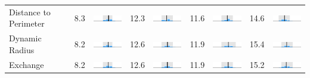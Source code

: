 \begin{table}
\begin{tabular}{l rm{7em} rm{7em} rm{7em} rm{7em}}
Distance to Perimeter  &   8.3 &     \includegraphics[width=7em]{mini_hist/TX_2004_rohrbach} &  12.3 &     \includegraphics[width=7em]{mini_hist/TX_2008_rohrbach} &  11.6 &     \includegraphics[width=7em]{mini_hist/TX_2012_rohrbach} &  14.6 &     \includegraphics[width=7em]{mini_hist/TX_2016_rohrbach} \\
Dynamic Radius         &   8.2 &   \includegraphics[width=7em]{mini_hist/TX_2004_dyn_radius} &  12.6 &   \includegraphics[width=7em]{mini_hist/TX_2008_dyn_radius} &  11.9 &   \includegraphics[width=7em]{mini_hist/TX_2012_dyn_radius} &  15.4 &   \includegraphics[width=7em]{mini_hist/TX_2016_dyn_radius} \\
Exchange               &   8.2 &     \includegraphics[width=7em]{mini_hist/TX_2004_exchange} &  12.6 &     \includegraphics[width=7em]{mini_hist/TX_2008_exchange} &  11.9 &     \includegraphics[width=7em]{mini_hist/TX_2012_exchange} &  15.2 &     \includegraphics[width=7em]{mini_hist/TX_2016_exchange} \\

\end{tabular}
\end{table}
